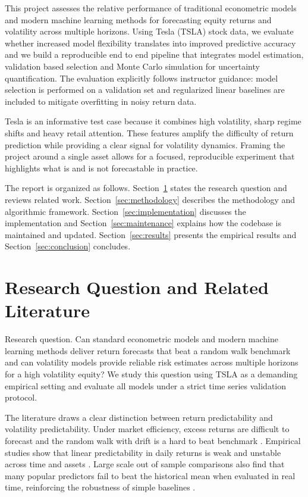 \documentclass[11pt,a4paper]{article}
\begin{document}
\noindent This project assesses the relative performance of traditional econometric models and modern machine learning methods for forecasting equity returns and volatility across multiple horizons. Using Tesla (TSLA) stock data, we evaluate whether increased model flexibility translates into improved predictive accuracy and we build a reproducible end to end pipeline that integrates model estimation, validation based selection and Monte Carlo simulation for uncertainty quantification. The evaluation explicitly follows instructor guidance: model selection is performed on a validation set and regularized linear baselines are included to mitigate overfitting in noisy return data.

\noindent Tesla is an informative test case because it combines high volatility, sharp regime shifts and heavy retail attention. These features amplify the difficulty of return prediction while providing a clear signal for volatility dynamics. Framing the project around a single asset allows for a focused, reproducible experiment that highlights what is and is not forecastable in practice.

\noindent The report is organized as follows. Section~\ref{sec:research-question} states the research question and reviews related work. Section~\ref{sec:methodology} describes the methodology and algorithmic framework. Section~\ref{sec:implementation} discusses the implementation and Section~\ref{sec:maintenance} explains how the codebase is maintained and updated. Section~\ref{sec:results} presents the empirical results and Section~\ref{sec:conclusion} concludes.
\endgroup

\section{Research Question and Related Literature}
\label{sec:research-question}
\begingroup
\setlength{\parskip}{0.35\baselineskip}
\setlength{\parindent}{1.25em}

\hspace*{\parindent}Research question. Can standard econometric models and modern machine learning methods deliver return forecasts that beat a random walk benchmark and can volatility models provide reliable risk estimates across multiple horizons for a high volatility equity? We study this question using TSLA as a demanding empirical setting and evaluate all models under a strict time series validation protocol.

\noindent The literature draws a clear distinction between return predictability and volatility predictability. Under market efficiency, excess returns are difficult to forecast and the random walk with drift is a hard to beat benchmark \parencite{Fama1970}. Empirical studies show that linear predictability in daily returns is weak and unstable across time and assets \parencite{Campbell1997,Hansen2005}. Large scale out of sample comparisons also find that many popular predictors fail to beat the historical mean when evaluated in real time, reinforcing the robustness of simple baselines \parencite{Welch2008}.
\end{document}
